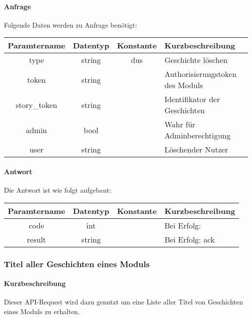 \paragraph{Anfrage}Folgende Daten werden zu Anfrage benötigt:
\begin{table}[H]
	\begin{tabular}{|c|c|c|p{6.5cm}|}
		\hline
		\textbf{Paramtername} & \textbf{Datentyp} & \textbf{Konstante} & \textbf{Kurzbeschreibung}                                                                                               \\ \hline
		type                & string            & dus                & Geschichte löschen \\ \hline
		token               & string            &                    & Authorisierungstoken des Moduls \\ \hline
		story\_token        & string            &                    & Identifikator der Geschichten \\ \hline
		admin               & bool              &                    & Wahr für Adminberechtigung \\ \hline
		user                & string            &                    & Löschender Nutzer \\ \hline
	\end{tabular}
\end{table}
\paragraph{Antwort}Die Antwort ist wie folgt aufgebaut:
\begin{table}[H]
	\begin{tabular}{|c|c|c|p{6.5cm}|}
		\hline
		\textbf{Paramtername} & \textbf{Datentyp} & \textbf{Konstante} & \textbf{Kurzbeschreibung}            \\ \hline                
		code                & int              &                 & Bei Erfolg: {\glqq 0\grqq} \\ \hline
		result              & string           &                 & Bei Erfolg: {\glqq ack\grqq} \\ \hline
	\end{tabular}
\end{table}
\subsubsection{Titel aller Geschichten eines Moduls}
\paragraph{Kurzbeschreibung}Dieser API-Request wird dazu genutzt um eine Liste aller Titel von Geschichten eines Moduls zu erhalten.
